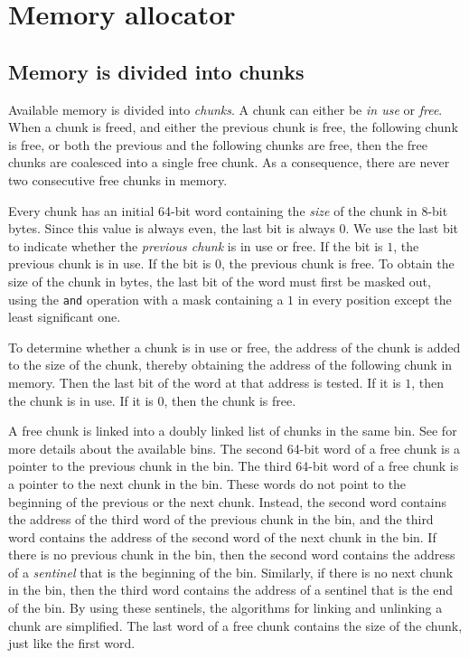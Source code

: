 \chapter{Memory allocator}
\label{app-memory-allocator}

\section{Memory is divided into chunks}
\label{sec-memory-allocator-memory-divided-into-chunks}

Available memory is divided into \emph{chunks}.  A chunk can either be
\emph{in use} or \emph{free}.  When a chunk is freed, and either the
previous chunk is free, the following chunk is free, or both the
previous and the following chunks are free, then the free chunks are
coalesced into a single free chunk.  As a consequence, there are never
two consecutive free chunks in memory.

Every chunk has an initial 64-bit word containing the \emph{size} of
the chunk in 8-bit bytes.  Since this value is always even, the last
bit is always $0$.  We use the last bit to indicate whether the
\emph{previous chunk} is in use or free.  If the bit is $1$, the
previous chunk is in use.  If the bit is $0$, the previous chunk is
free.  To obtain the size of the chunk in bytes, the last bit of the
word must first be masked out, using the \texttt{and} operation with
a mask containing a $1$ in every position except the least significant
one.

To determine whether a chunk is in use or free, the address of the
chunk is added to the size of the chunk, thereby obtaining the address
of the following chunk in memory.  Then the last bit of the word at
that address is tested.  If it is $1$, then the chunk is in use.  If
it is $0$, then the chunk is free.

A free chunk is linked into a doubly linked list of chunks in the same
bin.  See  for more
details about the available bins.  The second 64-bit word of a free
chunk is a pointer to the previous chunk in the bin.  The third 64-bit
word of a free chunk is a pointer to the next chunk in the bin.  These
words do not point to the beginning of the previous or the next chunk.
Instead, the second word contains the address of the third word of the
previous chunk in the bin, and the third word contains the address of
the second word of the next chunk in the bin.  If there is no previous
chunk in the bin, then the second word contains the address of a
\emph{sentinel} that is the beginning of the bin.  Similarly, if there
is no next chunk in the bin, then the third word contains the address
of a sentinel that is the end of the bin.  By using these sentinels,
the algorithms for linking and unlinking a chunk are simplified.  The
last word of a free chunk contains the size of the chunk, just like
the first word.


